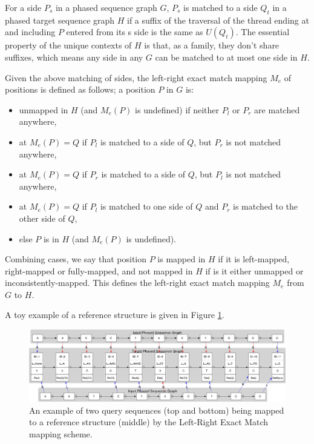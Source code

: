 \documentclass[11pt,proposal]{ucthesis}
\begin{document}
For a side $P_s$ in a phased sequence graph $G$, $P_s$ is matched to a side $Q_t$ in a phased target sequence graph $H$ if a suffix of the traversal of the thread ending at and including $P$ entered from its s side is the same as $U(Q_t)$. The essential property of the unique contexts of $H$ is that, as a family, they don’t share suffixes, which means any side in any $G$ can be matched to at most one side in $H$. 

Given the above matching of sides, the left-right exact match mapping $M_e$ of positions is defined as follows; a position $P$ in $G$ is:
\begin{itemize}
\item unmapped in $H$ (and $M_e(P)$ is undefined) if neither $P_l$ or $P_r$ are matched anywhere, 
\item {} at $M_e(P) = Q$ if $P_l$  is matched to a side of $Q$, but $P_r$  is not matched anywhere, 
\item {} at $M_e(P) = Q$ if $P_r$ is matched to a side of $Q$, but $P_l$ is not matched anywhere,
\item {} at $M_e(P) = Q$ if $P_l$  is matched to one side of $Q$ and $P_r$ is matched to the other side of $Q$,
\item else $P$ is  in $H$ (and $M_e(P)$ is undefined).
\end{itemize}

Combining cases, we say that position $P$ is mapped in $H$ if it is left-mapped, right-mapped or fully-mapped, and not mapped in $H$ if is it either unmapped or inconsistently-mapped. This defines the left-right exact match mapping $M_e$ from $G$ to $H$. 

A toy example of a reference structure is given in Figure \ref{fig:lrexactmatch}.

\begin{figure}[ht]
    \centering
    \includegraphics[width=1.0\textwidth]{figures/lrexactmatch.png}
    \caption{An example of two query sequences (top and bottom) being mapped to a reference structure (middle) by the Left-Right Exact Match mapping scheme.}
    \label{fig:lrexactmatch}
\end{figure}
\end{document}
